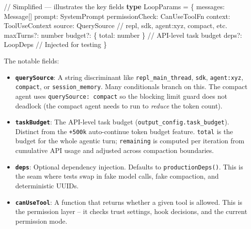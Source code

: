 \documentclass[
  english,
  11pt,
  letterpaper,
]{book}
\newenvironment{Shaded}{\begin{snugshade}}{\end{snugshade}}
\newcommand{\CommentTok}[1]{\textcolor[rgb]{0.37,0.37,0.37}{#1}}
\newcommand{\DataTypeTok}[1]{\textcolor[rgb]{0.68,0.00,0.00}{#1}}
\newcommand{\KeywordTok}[1]{\textcolor[rgb]{0.00,0.23,0.31}{\textbf{#1}}}
\newcommand{\NormalTok}[1]{\textcolor[rgb]{0.00,0.23,0.31}{#1}}
\newcommand{\OperatorTok}[1]{\textcolor[rgb]{0.37,0.37,0.37}{#1}}
\begin{document}
\begin{Shaded}
\begin{Highlighting}[]
\CommentTok{// Simplified — illustrates the key fields}
\KeywordTok{type}\NormalTok{ LoopParams }\OperatorTok{=}\NormalTok{ \{}
\NormalTok{  messages}\OperatorTok{:}\NormalTok{ Message[]}
\NormalTok{  prompt}\OperatorTok{:}\NormalTok{ SystemPrompt}
\NormalTok{  permissionCheck}\OperatorTok{:}\NormalTok{ CanUseToolFn}
\NormalTok{  context}\OperatorTok{:}\NormalTok{ ToolUseContext}
\NormalTok{  source}\OperatorTok{:}\NormalTok{ QuerySource         }\CommentTok{// \textquotesingle{}repl\textquotesingle{}, \textquotesingle{}sdk\textquotesingle{}, \textquotesingle{}agent:xyz\textquotesingle{}, \textquotesingle{}compact\textquotesingle{}, etc.}
\NormalTok{  maxTurns}\OperatorTok{?:} \DataTypeTok{number}
\NormalTok{  budget}\OperatorTok{?:}\NormalTok{ \{ total}\OperatorTok{:} \DataTypeTok{number}\NormalTok{ \}  }\CommentTok{// API{-}level task budget}
\NormalTok{  deps}\OperatorTok{?:}\NormalTok{ LoopDeps             }\CommentTok{// Injected for testing}
\NormalTok{\}}
\end{Highlighting}
\end{Shaded}

The notable fields:

\begin{itemize}
\item
  \textbf{\texttt{querySource}}: A string discriminant like
  \texttt{\textquotesingle{}repl\_main\_thread\textquotesingle{}},
  \texttt{\textquotesingle{}sdk\textquotesingle{}},
  \texttt{\textquotesingle{}agent:xyz\textquotesingle{}},
  \texttt{\textquotesingle{}compact\textquotesingle{}}, or
  \texttt{\textquotesingle{}session\_memory\textquotesingle{}}. Many
  conditionals branch on this. The compact agent uses
  \texttt{querySource:\ \textquotesingle{}compact\textquotesingle{}} so
  the blocking limit guard does not deadlock (the compact agent needs to
  run to \emph{reduce} the token count).
\item
  \textbf{\texttt{taskBudget}}: The API-level task budget
  (\texttt{output\_config.task\_budget}). Distinct from the
  \texttt{+500k} auto-continue token budget feature. \texttt{total} is
  the budget for the whole agentic turn; \texttt{remaining} is computed
  per iteration from cumulative API usage and adjusted across compaction
  boundaries.
\item
  \textbf{\texttt{deps}}: Optional dependency injection. Defaults to
  \texttt{productionDeps()}. This is the seam where tests swap in fake
  model calls, fake compaction, and deterministic UUIDs.
\item
  \textbf{\texttt{canUseTool}}: A function that returns whether a given
  tool is allowed. This is the permission layer -- it checks trust
  settings, hook decisions, and the current permission mode.
\end{itemize}
\end{document}
